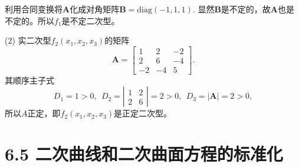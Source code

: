 \documentclass[compress,mathserif,cjk]{beamer}
\theoremstyle{remark}
\numberwithin{equation}{section}
\begin{document}
\begin{CJK}{UTF8}{gbsn}
\begin{frame}
利用合同变换将$\bm A$化成对角矩阵$\bm B=\mathrm{diag}(-1,1,1)$. 显然$\bm B$是不定的，故$\bm A$也是不定的。所以$f_1$是不定二次型。
\end{frame}
\begin{frame}
(2) 实二次型$f_2(x_1,x_2,x_3)$的矩阵
$$\bm A=\left[\begin{matrix}1&2&-2\\2&6&-4\\-2&-4&5\end{matrix}\right].$$
其顺序主子式
$$D_1=1>0,~~D_2=\left|\begin{matrix}1&2\\2&6\end{matrix}\right|=2>0,~~D_3=|\bm A|=2>0,$$
所以$A$正定，即$f_2(x_1,x_2,x_3)$是正定二次型。
\end{frame}

\section[6.5]{6.5 二次曲线和二次曲面方程的标准化}


\end{CJK}
\end{document}
